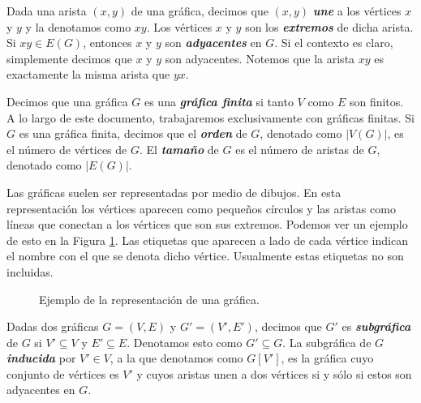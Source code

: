 Dada una arista $(x,y)$ de una gráfica, decimos que $(x,y)$ \textbf{\emph{une}} a los vértices $x$ y $y$ y la denotamos como $xy$. Los vértices $x$ y $y$ son los \textbf{\emph{extremos}} de dicha arista. Si $xy \in E(G)$, entonces $x$ y $y$ son \textbf{\emph{adyacentes}} en $G$. Si el contexto es claro, simplemente decimos que $x$ y $y$ son adyacentes. Notemos que la arista $xy$ es exactamente la misma arista que $yx$.

Decimos que una gráfica $G$ es una \textbf{\textit{gráfica finita}} si tanto $V$ como $E$ son finitos. A lo largo de este documento, trabajaremos exclusivamente con gráficas finitas. Si $G$ es una gráfica finita, decimos que el \textbf{\emph{orden}} de $G$, denotado como $|V(G)|$, es el número de vértices de $G$. El \textbf{\emph{tamaño}} de $G$ es el número de aristas de $G$, denotado como $|E(G)|$.

Las gráficas suelen ser representadas por medio de dibujos. En esta representación los vértices aparecen como pequeños círculos y las aristas como líneas que conectan a los vértices que son sus extremos. Podemos ver un ejemplo de esto en la Figura \ref{fig_ejemplo_graph}. Las etiquetas que aparecen a lado de cada vértice indican el nombre con el que se denota dicho vértice. Usualmente estas etiquetas no son incluidas.

\begin{figure}[ht!]
\begin{center}
\end{center}
\caption{Ejemplo de la representación de una gráfica.}\label{fig_ejemplo_graph}
\end{figure}

Dadas dos gráficas $G=(V,E)$ y $G'=(V',E')$, decimos que $G'$ es \textbf{\emph{subgráfica}} de $G$ si $V' \subseteq V$ y $E' \subseteq E$. Denotamos esto como $G' \subseteq G$. La subgráfica de $G$ \emph{\textbf{inducida}} por $V'\in V$, a la que denotamos como $G[V']$, es la gráfica cuyo conjunto de vértices es $V'$ y cuyos aristas unen a dos vértices si y sólo si estos son adyacentes en $G$.

